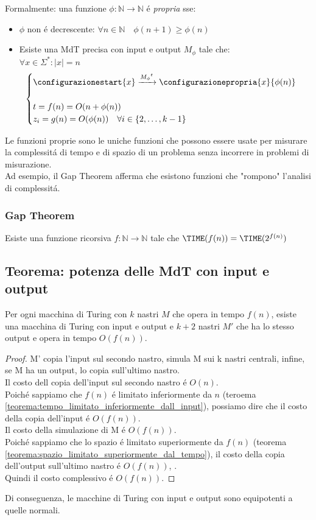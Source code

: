 Formalmente: una funzione $\phi: \mathbb{N} \rightarrow \mathbb{N}$ é \textit{propria} sse:
\begin{itemize}
	\item $\phi$ non é decrescente: \quad $\forall n \in \mathbb{N} \quad \phi(n+1) \geq \phi(n)$
	\item Esiste una MdT precisa con input e output $M_\phi$ tale che:\\ $\forall x \in \Sigma^* : |x| = n$ \\
	\[
	\begin{cases}
		\configurazionestart{x} \xrightarrow{{M_\phi}^t} \configurazionepropria{x}{\phi(n)} \\
		\\
		t = f(n) = O(n + \phi(n)) \\
		z_i = g(n) = O(\phi(n)) \quad \forall i \in \{2, \dots, k-1\}
	\end{cases}
	\]
\end{itemize}

Le funzioni proprie sono le uniche funzioni che possono essere usate per misurare la complessitá di tempo e di spazio di un problema senza incorrere in problemi di misurazione.\\ 
Ad esempio, il Gap Theorem afferma che esistono funzioni che "rompono" l'analisi di complessitá.

\subsubsection*{Gap Theorem}
Esiste una funzione ricorsiva $f: \mathbb{N} \rightarrow \mathbb{N}$ tale che {$\TIME({f(n)}) = \TIME({2^{f(n)}})$}


\subsection{Teorema: potenza delle MdT con input e output}
Per ogni macchina di Turing con $k$ nastri $M$ che opera in tempo $f(n)$, esiste una macchina di Turing con input e output e $k+2$ nastri $M'$ che ha lo stesso output e opera in tempo $O(f(n))$.
\begin{proof}
M' copia l'input sul secondo nastro, simula M sui k nastri centrali, infine, se M ha un output, lo copia sull'ultimo nastro. \\
Il costo dell copia dell'input sul secondo nastro é $O(n)$. \\
Poiché sappiamo che $f(n)$ é limitato inferiormente da $n$ (teroema \ref{teorema:tempo_limitato_inferiormente_dall_input}), possiamo dire che il costo della copia dell'input é $O(f(n))$. \\
Il costo della simulazione di M é $O(f(n))$. \\
Poiché sappiamo che lo spazio é limitato superiormente da $f(n)$ (teorema \ref{teorema:spazio_limitato_superiormente_dal_tempo}), il costo della copia dell'output sull'ultimo nastro é $O(f(n))$, . \\
Quindi il costo complessivo é $O(f(n))$.
\end{proof}
Di conseguenza, le macchine di Turing con input e output sono equipotenti a quelle normali.


